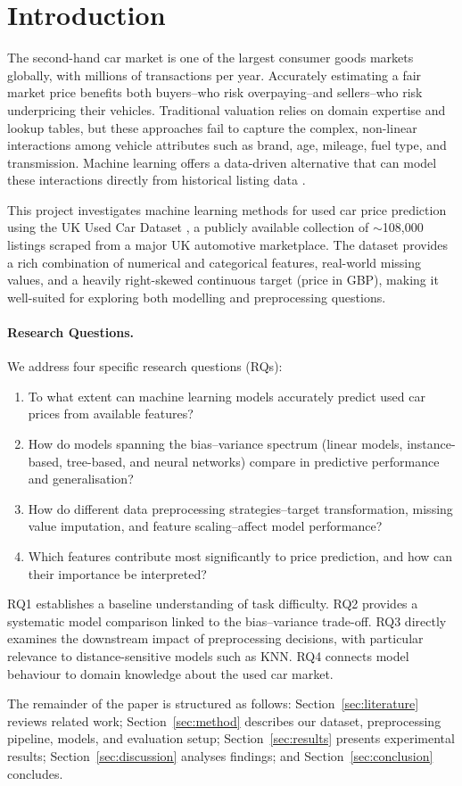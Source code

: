 \section{Introduction}
\label{sec:intro}

The second-hand car market is one of the largest consumer goods markets globally, with millions of transactions per year.
Accurately estimating a fair market price benefits both buyers--who risk overpaying--and sellers--who risk underpricing their vehicles.
Traditional valuation relies on domain expertise and lookup tables, but these approaches fail to capture the complex, non-linear interactions among vehicle attributes such as brand, age, mileage, fuel type, and transmission.
Machine learning offers a data-driven alternative that can model these interactions directly from historical listing data \cite{gegic2019car}.

This project investigates machine learning methods for used car price prediction using the UK Used Car Dataset \cite{usedcardataset2021}, a publicly available collection of $\sim$108{,}000 listings scraped from a major UK automotive marketplace.
The dataset provides a rich combination of numerical and categorical features, real-world missing values, and a heavily right-skewed continuous target (price in GBP), making it well-suited for exploring both modelling and preprocessing questions.

\paragraph{Research Questions.}
We address four specific research questions (RQs):
\begin{enumerate}
  \item[\textbf{RQ1}] To what extent can machine learning models accurately predict used car prices from available features?
  \item[\textbf{RQ2}] How do models spanning the bias--variance spectrum (linear models, instance-based, tree-based, and neural networks) compare in predictive performance and generalisation?
  \item[\textbf{RQ3}] How do different data preprocessing strategies--target transformation, missing value imputation, and feature scaling--affect model performance?
  \item[\textbf{RQ4}] Which features contribute most significantly to price prediction, and how can their importance be interpreted?
\end{enumerate}

RQ1 establishes a baseline understanding of task difficulty. RQ2 provides a systematic model comparison linked to the bias--variance trade-off. RQ3 directly examines the downstream impact of preprocessing decisions, with particular relevance to distance-sensitive models such as KNN. RQ4 connects model behaviour to domain knowledge about the used car market.

The remainder of the paper is structured as follows: Section~\ref{sec:literature} reviews related work; Section~\ref{sec:method} describes our dataset, preprocessing pipeline, models, and evaluation setup; Section~\ref{sec:results} presents experimental results; Section~\ref{sec:discussion} analyses findings; and Section~\ref{sec:conclusion} concludes.
